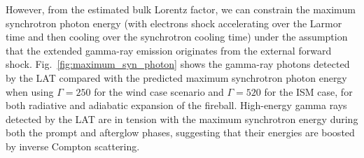 \documentclass[preprint]{aastex631}
\begin{document}

However, from the estimated bulk Lorentz factor, we can constrain the maximum synchrotron photon energy (with electrons shock accelerating over the Larmor time and then cooling over the synchrotron cooling time) under the assumption that the extended gamma-ray emission originates from the external forward shock. 
Fig.~\ref{fig:maximum_syn_photon} shows the gamma-ray photons detected by the LAT compared with the predicted maximum synchrotron photon energy when using $\Gamma=250$ for the wind case scenario and $\Gamma = 520$ for the ISM case, for both radiative and adiabatic expansion of the fireball. 
High-energy gamma rays detected by the LAT are in tension with the maximum synchrotron energy during both the prompt and afterglow phases, suggesting that their energies are boosted by inverse Compton scattering.
\end{document}
